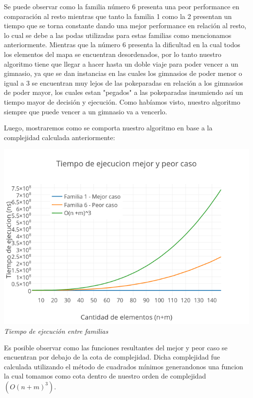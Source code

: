 Se puede observar como la familia n\'umero 6 presenta una peor performance en comparaci\'on al resto mientras que tanto la familia 1 como la 2 presentan un tiempo que se torna constante dando una mejor performance en relaci\'on al resto, lo cual se debe a las podas utilizadas para estas familias como mencionamos anteriormente. Mientras que la n\'umero 6 presenta la dificultad en la cual todos los elementos del mapa se encuentran desordenados, por lo tanto nuestro algoritmo tiene que llegar a hacer hasta un doble viaje para poder vencer a un gimnasio, ya que se dan instancias en las cuales los gimnasios de poder menor o igual a 3 se encuentran muy lejos de las pokeparadas en relaci\'on a los gimnasios de poder mayor, los cuales estan "pegados" a las pokeparadas insumiendo as\'i un tiempo mayor de decisi\'on y ejecuci\'on. Como hab\'iamos visto, nuestro algoritmo siempre que puede vencer a un gimnasio va a vencerlo.

Luego, mostraremos como se comporta nuestro algoritmo en base a la complejidad calculada anteriormente:

\vspace*{0.3cm} \vspace*{0.3cm}
  \begin{center}
\includegraphics[scale=0.60]{./EJ2/mejorcaso.png}
\\{\textit{Tiempo de ejecución entre familias}}
  \end{center}
  \vspace*{0.3cm}

  
Es posible observar como las funciones resultantes del mejor y peor caso se encuentran por debajo de la cota de complejidad. Dicha complejidad fue calculada utilizando el m\'etodo de cuadrados m\'inimos generandonos una funcion la cual tomamos como cota dentro de nuestro orden de complejidad $(O(n+m)^3)$. 

